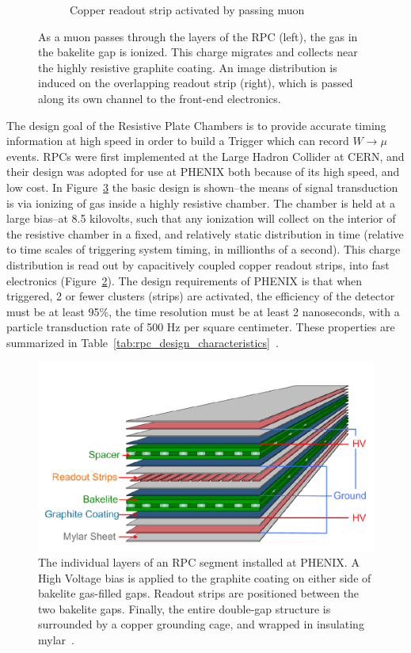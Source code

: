 \begin{figure}
\begin{subfigure}[b]{0.4\textwidth}
    \caption{Copper readout strip activated by passing muon}
    \label{fig:rpc_hit_top_view}
  \end{subfigure}
  \caption{
    As a muon passes through the layers of the RPC (left), the gas in the
    bakelite gap is ionized. This charge migrates and collects near the highly
    resistive graphite coating. An image distribution is induced on the
    overlapping readout strip (right), which is passed along its own channel to
    the front-end electronics.
  }
  \label{fig:muon_hit_rpc}
\end{figure}

The design goal of the Resistive Plate Chambers is to provide accurate timing
information at high speed in order to build a Trigger which can record
$W\rightarrow\mu$ events. RPCs were first implemented at the Large Hadron
Collider at CERN, and their design was adopted for use at PHENIX both
because of its high speed, and low cost. In Figure~\ref{fig:rpc_exploded} the
basic design is shown--the means of signal transduction is via ionizing of gas
inside a highly resistive chamber. The chamber is held at a large bias--at 8.5
kilovolts, such that any ionization will collect on the interior of the
resistive chamber in a fixed, and relatively static distribution in time
(relative to time scales of triggering system timing, in millionths of a
second). This charge distribution is read out by capacitively coupled copper
readout strips, into fast electronics (Figure~\ref{fig:muon_hit_rpc}). The
design requirements of PHENIX is that when triggered, 2 or fewer clusters
(strips) are activated, the efficiency of the detector must be at least 95\%,
the time resolution must be at least 2 nanoseconds, with a particle transduction
rate of 500 Hz per square centimeter.  These properties are summarized in
Table~\ref{tab:rpc_design_characteristics}~\cite{Fukao2011}.

\begin{figure}[ht]
  \centering
  \includegraphics[width=0.7\linewidth]{./figures/rpc_exploded.png}
  \caption{
    The individual layers of an RPC segment installed at PHENIX. A High Voltage
    bias is applied to the graphite coating on either side of bakelite
    gas-filled gaps. Readout strips are positioned between the two bakelite
    gaps. Finally, the entire double-gap structure is surrounded by a copper
    grounding cage, and wrapped in insulating mylar~\cite{Fukao2011}.
  }
  \label{fig:rpc_exploded}
\end{figure}


